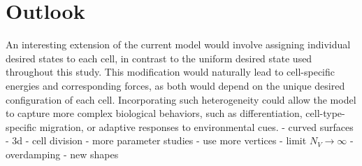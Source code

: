 \section{Outlook}

An interesting extension of the current model would involve assigning individual desired states to each cell, in contrast to the uniform desired state used throughout this study. 
This modification would naturally lead to cell-specific energies and corresponding forces, as both would depend on the unique desired configuration of each cell. 
Incorporating such heterogeneity could allow the model to capture more complex biological behaviors, such as differentiation, cell-type-specific migration, or adaptive responses to environmental cues. 
- curved surfaces 
- 3d 
- cell division 
- more parameter studies 
- use more vertices  
- limit $N_V \rightarrow \infty$ 
- overdamping 
- new shapes  
